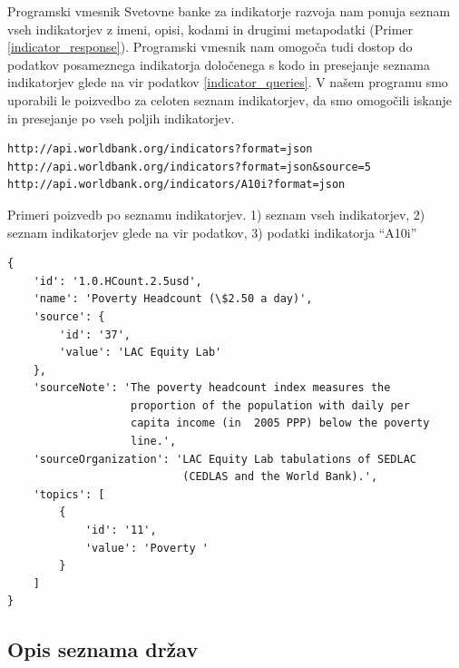 Programski vmesnik Svetovne banke za indikatorje razvoja nam ponuja seznam 
vseh indikatorjev z imeni, opisi, kodami in drugimi metapodatki 
(Primer \ref{indicator_response}). Programski vmesnik nam omogoča tudi dostop
do podatkov posameznega indikatorja določenega s kodo in presejanje seznama 
indikatorjev glede na vir podatkov \ref{indicator_queries}. V našem programu
smo uporabili le poizvedbo za celoten seznam indikatorjev, da smo omogočili 
iskanje in presejanje po vseh poljih indikatorjev.

\begin{snippet}
\begin{center}
\begin{lstlisting}
http://api.worldbank.org/indicators?format=json
http://api.worldbank.org/indicators?format=json&source=5
http://api.worldbank.org/indicators/A10i?format=json
\end{lstlisting}
\end{center}
\caption{Primeri poizvedb po seznamu indikatorjev.
1) seznam vseh indikatorjev, 2) seznam indikatorjev glede na vir podatkov,
3) podatki indikatorja ``A10i''}
\label{indicator_queries}
\end{snippet} 


\begin{snippet}
\begin{center}
\begin{lstlisting}
{
    'id': '1.0.HCount.2.5usd',
    'name': 'Poverty Headcount (\$2.50 a day)',
    'source': {
        'id': '37',
        'value': 'LAC Equity Lab'
    },
    'sourceNote': 'The poverty headcount index measures the 
                   proportion of the population with daily per 
                   capita income (in  2005 PPP) below the poverty
                   line.',
    'sourceOrganization': 'LAC Equity Lab tabulations of SEDLAC 
                           (CEDLAS and the World Bank).',
    'topics': [
        {
            'id': '11',
            'value': 'Poverty '
        }
    ]
}
\end{lstlisting}
\end{center}
\caption{Podatki indikatorja 
stopnja revščine pri dohodku 2,5 dolarja na dan.}
\label{indicator_response}
\end{snippet} 

\subsection{Opis seznama držav}

